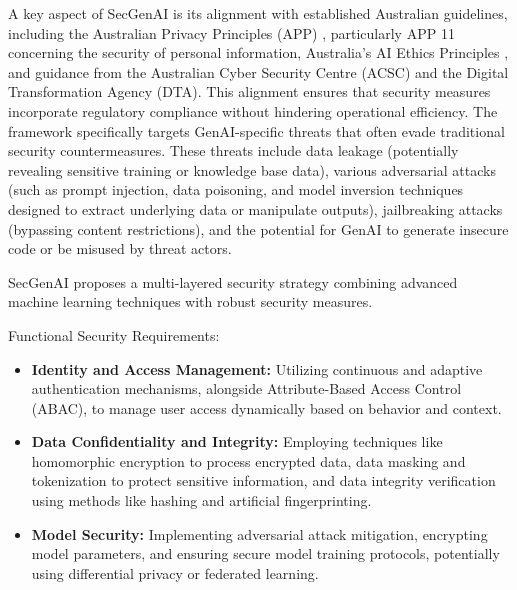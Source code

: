 A key aspect of SecGenAI is its alignment with established Australian guidelines, including the Australian Privacy Principles (APP) \cite{resources_australias_2024}, particularly APP 11 concerning the security of personal information, Australia's AI Ethics Principles \cite{resources_australias_2024}, and guidance from the Australian Cyber Security Centre (ACSC) and the Digital Transformation Agency (DTA)\cite{haryanto_secgenai_2024}. This alignment ensures that security measures incorporate regulatory compliance without hindering operational efficiency\cite{haryanto_secgenai_2024}. The framework specifically targets GenAI-specific threats that often evade traditional security countermeasures. These threats include data leakage (potentially revealing sensitive training or knowledge base data), various adversarial attacks (such as prompt injection, data poisoning, and model inversion techniques designed to extract underlying data or manipulate outputs), jailbreaking attacks (bypassing content restrictions), and the potential for GenAI to generate insecure code or be misused by threat actors\cite{haryanto_secgenai_2024}.

SecGenAI proposes a multi-layered security strategy combining advanced machine learning techniques with robust security measures.

Functional Security Requirements:
\begin{itemize}
    \item \textbf{Identity and Access Management:} Utilizing continuous and adaptive authentication mechanisms, alongside Attribute-Based Access Control (ABAC), to manage user access dynamically based on behavior and context\cite{haryanto_secgenai_2024}.
    \item \textbf{Data Confidentiality and Integrity:} Employing techniques like homomorphic encryption to process encrypted data, data masking and tokenization to protect sensitive information, and data integrity verification using methods like hashing and artificial fingerprinting\cite{haryanto_secgenai_2024}.
    \item \textbf{Model Security:} Implementing adversarial attack mitigation, encrypting model parameters, and ensuring secure model training protocols, potentially using differential privacy or federated learning\cite{haryanto_secgenai_2024}.
\end{itemize}

